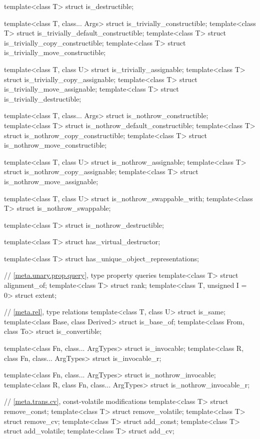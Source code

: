 \begin{codeblock}
{  template<class T> struct is_destructible;

  template<class T, class... Args> struct is_trivially_constructible;
  template<class T> struct is_trivially_default_constructible;
  template<class T> struct is_trivially_copy_constructible;
  template<class T> struct is_trivially_move_constructible;

  template<class T, class U> struct is_trivially_assignable;
  template<class T> struct is_trivially_copy_assignable;
  template<class T> struct is_trivially_move_assignable;
  template<class T> struct is_trivially_destructible;

  template<class T, class... Args> struct is_nothrow_constructible;
  template<class T> struct is_nothrow_default_constructible;
  template<class T> struct is_nothrow_copy_constructible;
  template<class T> struct is_nothrow_move_constructible;

  template<class T, class U> struct is_nothrow_assignable;
  template<class T> struct is_nothrow_copy_assignable;
  template<class T> struct is_nothrow_move_assignable;

  template<class T, class U> struct is_nothrow_swappable_with;
  template<class T> struct is_nothrow_swappable;

  template<class T> struct is_nothrow_destructible;

  template<class T> struct has_virtual_destructor;

  template<class T> struct has_unique_object_representations;

  // \ref{meta.unary.prop.query}, type property queries
  template<class T> struct alignment_of;
  template<class T> struct rank;
  template<class T, unsigned I = 0> struct extent;

  // \ref{meta.rel}, type relations
  template<class T, class U> struct is_same;
  template<class Base, class Derived> struct is_base_of;
  template<class From, class To> struct is_convertible;

  template<class Fn, class... ArgTypes> struct is_invocable;
  template<class R, class Fn, class... ArgTypes> struct is_invocable_r;

  template<class Fn, class... ArgTypes> struct is_nothrow_invocable;
  template<class R, class Fn, class... ArgTypes> struct is_nothrow_invocable_r;

  // \ref{meta.trans.cv}, const-volatile modifications
  template<class T> struct remove_const;
  template<class T> struct remove_volatile;
  template<class T> struct remove_cv;
  template<class T> struct add_const;
  template<class T> struct add_volatile;
  template<class T> struct add_cv;

}
\end{codeblock}
